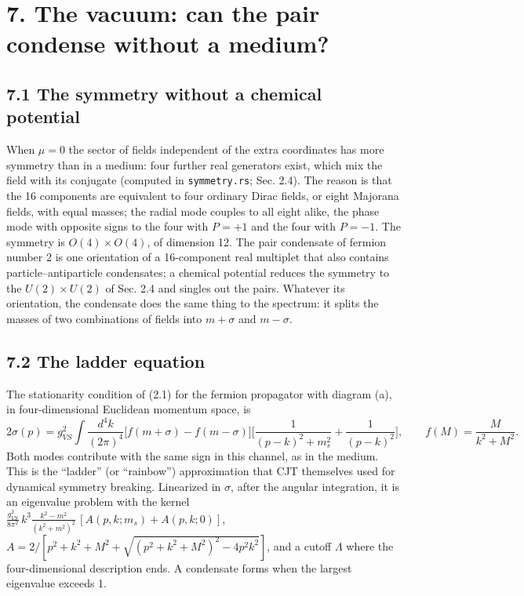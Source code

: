 \documentclass[
  10pt,
]{article}
\begin{document}
\hypertarget{the-vacuum-can-the-pair-condense-without-a-medium}{%
\section{7. The vacuum: can the pair condense without a
medium?}\label{the-vacuum-can-the-pair-condense-without-a-medium}}

\hypertarget{the-symmetry-without-a-chemical-potential}{%
\subsection{7.1 The symmetry without a chemical
potential}\label{the-symmetry-without-a-chemical-potential}}

When \(\mu=0\) the sector of fields independent of the extra coordinates
has more symmetry than in a medium: four further real generators exist,
which mix the field with its conjugate (computed in
\texttt{symmetry.rs}; Sec. 2.4). The reason is that the 16 components
are equivalent to four ordinary Dirac fields, or eight Majorana fields,
with equal masses; the radial mode couples to all eight alike, the phase
mode with opposite signs to the four with \(P=+1\) and the four with
\(P=-1\). The symmetry is \(O(4)\times O(4)\), of dimension 12. The pair
condensate of fermion number 2 is one orientation of a 16-component real
multiplet that also contains particle--antiparticle condensates; a
chemical potential reduces the symmetry to the \(U(2)\times U(2)\) of
Sec. 2.4 and singles out the pairs. Whatever its orientation, the
condensate does the same thing to the spectrum: it splits the masses of
two combinations of fields into \(m+\sigma\) and \(m-\sigma\).

\hypertarget{the-ladder-equation}{%
\subsection{7.2 The ladder equation}\label{the-ladder-equation}}

The stationarity condition of (2.1) for the fermion propagator with
diagram (a), in four-dimensional Euclidean momentum space, is
\[2\sigma(p)=g_{VS}^2\!\int\!\!\frac{d^4k}{(2\pi)^4}\big[f(m+\sigma)-f(m-\sigma)\big]\Big[\frac{1}{(p-k)^2+m_s^2}+\frac{1}{(p-k)^2}\Big],\qquad f(M)=\frac{M}{k^2+M^2}.\tag{7.1}\]
Both modes contribute with the same sign in this channel, as in the
medium. This is the ``ladder'' (or ``rainbow'') approximation that CJT
themselves used for dynamical symmetry breaking. Linearized in
\(\sigma\), after the angular integration, it is an eigenvalue problem
with the kernel
\(\frac{g_{VS}^2}{8\pi^2}\,k^3\frac{k^2-m^2}{(k^2+m^2)^2}\,[A(p,k;m_s)+A(p,k;0)]\),
\(A=2/[p^2+k^2+M^2+\sqrt{(p^2+k^2+M^2)^2-4p^2k^2}]\), and a cutoff
\(\Lambda\) where the four-dimensional description ends. A condensate
forms when the largest eigenvalue exceeds 1.
\end{document}
